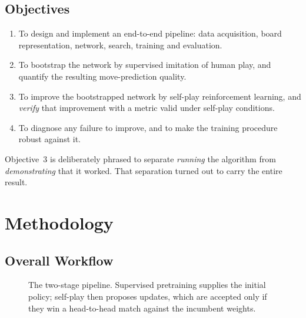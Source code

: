 \documentclass{article}
\begin{document}
\subsection{Objectives}
\begin{enumerate}[noitemsep]
  \item To design and implement an end-to-end pipeline: data acquisition,
        board representation, network, search, training and evaluation.
  \item To bootstrap the network by supervised imitation of human play, and
        quantify the resulting move-prediction quality.
  \item To improve the bootstrapped network by self-play reinforcement
        learning, and \emph{verify} that improvement with a metric valid
        under self-play conditions.
  \item To diagnose any failure to improve, and to make the training
        procedure robust against it.
\end{enumerate}

Objective~3 is deliberately phrased to separate \emph{running} the algorithm
from \emph{demonstrating} that it worked. That separation turned out to carry
the entire result.

\section{Methodology}
\label{sec:method}

\subsection{Overall Workflow}

\begin{figure}[t]
\centering
{}
\caption{The two-stage pipeline. Supervised pretraining supplies the initial
policy; self-play then proposes updates, which are accepted only if they win
a head-to-head match against the incumbent weights.}
\label{fig:pipeline}
\end{figure}
\end{document}
